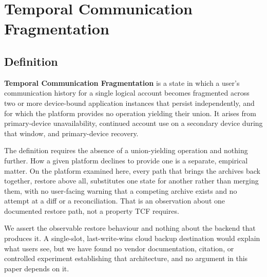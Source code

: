 
\section{Temporal Communication Fragmentation}
\label{sec:tcf}

\subsection{Definition}
\label{sec:tcf:definition}

\textbf{Temporal Communication Fragmentation} is a state in which a user's
communication history for a single logical account becomes fragmented across
two or more device-bound application instances that persist independently, and
for which the platform provides no operation yielding their union. It arises
from primary-device unavailability, continued account use on a secondary
device during that window, and primary-device recovery.

The definition requires the absence of a union-yielding operation and nothing
further. How a given platform declines to provide one is a separate, empirical
matter. On the platform examined here, every path that brings the archives back
together, restore above all, substitutes one state for another rather than
merging them, with no user-facing warning that a competing archive exists and
no attempt at a diff or a reconciliation. That is an observation about one
documented restore path, not a property TCF requires.

We assert the observable restore behaviour and nothing about the backend that
produces it. A single-slot, last-write-wins cloud backup destination would
explain what users see, but we have found no vendor documentation, citation, or
controlled experiment establishing that architecture, and no argument in this
paper depends on it.

